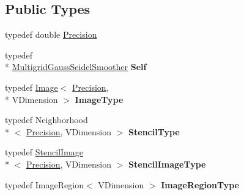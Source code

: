 \subsection*{Public Types}
\begin{DoxyCompactItemize}
\item 
typedef double \hyperlink{classitk_1_1mad_1_1_multigrid_gauss_seidel_smoother_a317b3e06f245f2953ea8a6bb2fe01500}{Precision}
\item 
\hypertarget{classitk_1_1mad_1_1_multigrid_gauss_seidel_smoother_a7ea983c1815cfd251c9b027ae5b67c96}{typedef \\*
\hyperlink{classitk_1_1mad_1_1_multigrid_gauss_seidel_smoother}{Multigrid\-Gauss\-Seidel\-Smoother} {\bfseries Self}}\label{classitk_1_1mad_1_1_multigrid_gauss_seidel_smoother_a7ea983c1815cfd251c9b027ae5b67c96}

\item 
\hypertarget{classitk_1_1mad_1_1_multigrid_gauss_seidel_smoother_a1a75d5f5179b5c19d8cea51945e8a305}{typedef \hyperlink{class_image}{Image}$<$ \hyperlink{classitk_1_1mad_1_1_multigrid_gauss_seidel_smoother_a317b3e06f245f2953ea8a6bb2fe01500}{Precision}, \\*
V\-Dimension $>$ {\bfseries Image\-Type}}\label{classitk_1_1mad_1_1_multigrid_gauss_seidel_smoother_a1a75d5f5179b5c19d8cea51945e8a305}

\item 
\hypertarget{classitk_1_1mad_1_1_multigrid_gauss_seidel_smoother_af9f0888d73a32ebee321962a846ccc5b}{typedef Neighborhood\\*
$<$ \hyperlink{classitk_1_1mad_1_1_multigrid_gauss_seidel_smoother_a317b3e06f245f2953ea8a6bb2fe01500}{Precision}, V\-Dimension $>$ {\bfseries Stencil\-Type}}\label{classitk_1_1mad_1_1_multigrid_gauss_seidel_smoother_af9f0888d73a32ebee321962a846ccc5b}

\item 
\hypertarget{classitk_1_1mad_1_1_multigrid_gauss_seidel_smoother_a28861e612bc8d787bb300024b77da55a}{typedef \hyperlink{classitk_1_1mad_1_1_stencil_image}{Stencil\-Image}\\*
$<$ \hyperlink{classitk_1_1mad_1_1_multigrid_gauss_seidel_smoother_a317b3e06f245f2953ea8a6bb2fe01500}{Precision}, V\-Dimension $>$ {\bfseries Stencil\-Image\-Type}}\label{classitk_1_1mad_1_1_multigrid_gauss_seidel_smoother_a28861e612bc8d787bb300024b77da55a}

\item 
\hypertarget{classitk_1_1mad_1_1_multigrid_gauss_seidel_smoother_a28c14e90449ab800803266d8a2f22bb6}{typedef Image\-Region$<$ V\-Dimension $>$ {\bfseries Image\-Region\-Type}}\label{classitk_1_1mad_1_1_multigrid_gauss_seidel_smoother_a28c14e90449ab800803266d8a2f22bb6}


\end{DoxyCompactItemize}
